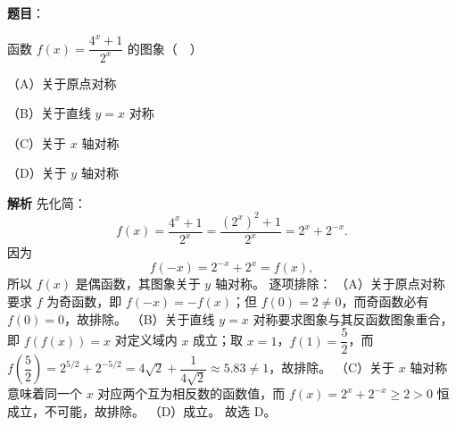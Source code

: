 \begin{answer}

\textbf{题目}：

函数 $f(x)=\dfrac{4^x+1}{2^x}$ 的图象（　）

（A）关于原点对称

（B）关于直线 $y=x$ 对称

（C）关于 $x$ 轴对称

（D）关于 $y$ 轴对称

\textbf{解析}
先化简：
\nopagebreak[4]
\[f(x)=\frac{4^x+1}{2^x}=\frac{\left(2^x\right)^2+1}{2^x}=2^x+2^{-x}.\]
因为
\nopagebreak[4]
\[f(-x)=2^{-x}+2^{x}=f(x),\]
所以 $f(x)$ 是偶函数，其图象关于 $y$ 轴对称。
逐项排除：
（A）关于原点对称要求 $f$ 为奇函数，即 $f(-x)=-f(x)$；但 $f(0)=2\neq0$，而奇函数必有 $f(0)=0$，故排除。
（B）关于直线 $y=x$ 对称要求图象与其反函数图象重合，即 $f\left(f(x)\right)=x$ 对定义域内 $x$ 成立；取 $x=1$，$f(1)=\dfrac52$，而 $f\left(\dfrac52\right)=2^{5/2}+2^{-5/2}=4\sqrt2+\dfrac{1}{4\sqrt2}\approx5.83\neq1$，故排除。
（C）关于 $x$ 轴对称意味着同一个 $x$ 对应两个互为相反数的函数值，而 $f(x)=2^x+2^{-x}\geqslant2>0$ 恒成立，不可能，故排除。
（D）成立。
故选 D。


\end{answer}
